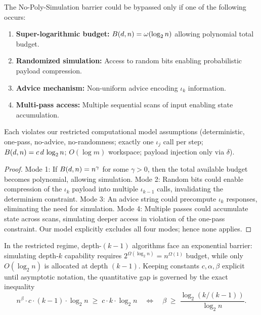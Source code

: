 \begin{lemma}
\label{AntiSim:lem:failure-modes}
The No-Poly-Simulation barrier could be bypassed only if one of the following occurs:
\begin{enumerate}
  \item \textbf{Super-logarithmic budget:} $\B(d,n) = \omega(\log_{2} n)$ allowing polynomial total budget.
  \item \textbf{Randomized simulation:} Access to random bits enabling probabilistic payload compression.
  \item \textbf{Advice mechanism:} Non-uniform advice encoding $\iota_k$ information.
  \item \textbf{Multi-pass access:} Multiple sequential scans of input enabling state accumulation.
\end{enumerate}
Each violates our restricted computational model assumptions (deterministic, one-pass, no-advice, no-randomness; exactly one $\iota_j$ call per step; $\B(d,n)=c\,d\,\log_{2} n$; $O(\log m)$ workspace; payload injection only via $\delta$).
\end{lemma}

\begin{proof}
Mode 1: If $\B(d,n) = n^\gamma$ for some $\gamma>0$, then the total available budget becomes polynomial, allowing simulation.
Mode 2: Random bits could enable compression of the $\iota_k$ payload into multiple $\iota_{k-1}$ calls, invalidating the determinism constraint.
Mode 3: An advice string could precompute $\iota_k$ responses, eliminating the need for simulation.
Mode 4: Multiple passes could accumulate state across scans, simulating deeper access in violation of the one-pass constraint.
Our model explicitly excludes all four modes; hence none applies.
\end{proof}

\begin{corollary}
\label{AntiSim:cor:barrier}
In the restricted regime, depth-\((k{-}1)\) algorithms face an exponential barrier: simulating depth-$k$ capability requires $2^{\Omega(\log_{2} n)} = n^{\Omega(1)}$ budget, while only $O(\log_{2} n)$ is allocated at depth $(k{-}1)$. Keeping constants $c,\alpha,\beta$ explicit until asymptotic notation, the quantitative gap is governed by the exact inequality
\[
n^{\beta} \cdot c \cdot (k{-}1) \cdot \log_{2} n
\;\ge\; c \cdot k \cdot \log_{2} n
\quad \Longleftrightarrow \quad
\beta \;\geq\; \frac{\log_{2}(k/(k{-}1))}{\log_{2} n}.
\]
\end{corollary}

